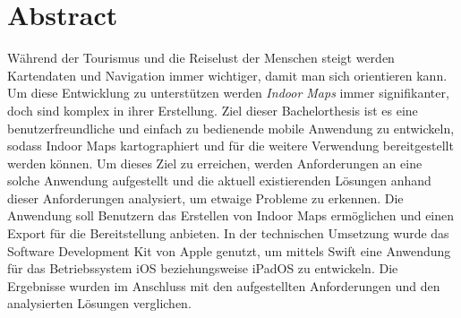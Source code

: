 \chapter*{Abstract}
Während der Tourismus und die Reiselust der Menschen steigt werden Kartendaten und Navigation immer wichtiger, damit man sich orientieren kann.
Um diese Entwicklung zu unterstützen werden \emph{Indoor Maps} immer signifikanter, doch sind komplex in ihrer Erstellung.\pbreak%
%
Ziel dieser Bachelorthesis ist es eine benutzerfreundliche und einfach zu bedienende mobile Anwendung zu entwickeln, sodass Indoor Maps kartographiert und für die weitere Verwendung bereitgestellt werden können.
Um dieses Ziel zu erreichen, werden Anforderungen an eine solche Anwendung aufgestellt und die aktuell existierenden Lösungen anhand dieser Anforderungen analysiert, um etwaige Probleme zu erkennen.\pbreak%
%
Die Anwendung soll Benutzern das Erstellen von Indoor Maps ermöglichen und einen Export für die Bereitstellung anbieten.
In der technischen Umsetzung wurde das Software Development Kit von Apple genutzt, um mittels Swift eine Anwendung für das Betriebssystem iOS beziehungsweise iPadOS zu entwickeln.
Die Ergebnisse wurden im Anschluss mit den aufgestellten Anforderungen und den analysierten Lösungen verglichen.
\clearpage
